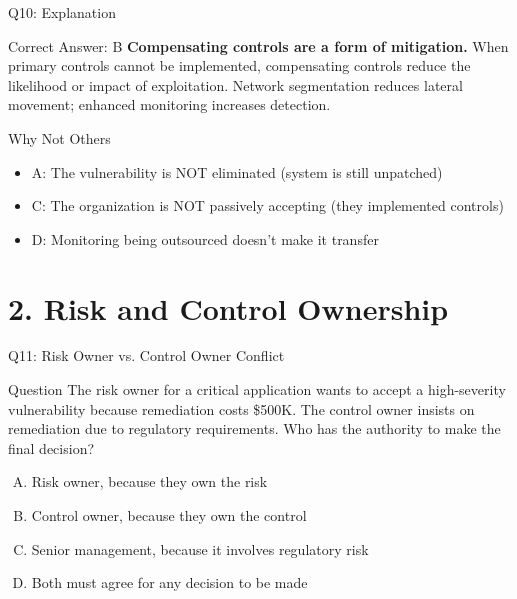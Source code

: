 \documentclass{beamer}
\begin{document}
	\begin{frame}{Q10: Explanation}
		\begin{block}{Correct Answer: B}
			\textbf{Compensating controls are a form of mitigation.} When primary controls cannot be implemented, compensating controls reduce the likelihood or impact of exploitation. Network segmentation reduces lateral movement; enhanced monitoring increases detection.
		\end{block}
		\begin{block}{Why Not Others}
			\begin{itemize}
				\item A: The vulnerability is NOT eliminated (system is still unpatched)
				\item C: The organization is NOT passively accepting (they implemented controls)
				\item D: Monitoring being outsourced doesn't make it transfer
			\end{itemize}
		\end{block}
	\end{frame}
	
	
	\section{2. Risk and Control Ownership}
	
	\begin{frame}{Q11: Risk Owner vs. Control Owner Conflict}
		\begin{block}{Question}
			The risk owner for a critical application wants to accept a high-severity vulnerability because remediation costs \$500K. The control owner insists on remediation due to regulatory requirements. Who has the authority to make the final decision?
		\end{block}
		\begin{enumerate}[(A)]
			\item Risk owner, because they own the risk
			\item Control owner, because they own the control
			\item Senior management, because it involves regulatory risk
			\item Both must agree for any decision to be made
		\end{enumerate}
	\end{frame}
	
\end{document}
